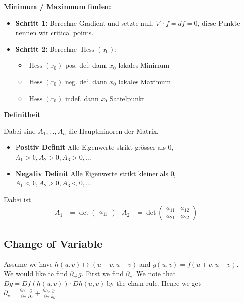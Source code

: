 \documentclass[25pt]{sciposter}
\newenvironment{method}[1]{\begin{mdframed}[backgroundcolor=blue!10,innertopmargin=15pt, innerbottommargin=15pt, nobreak=true]
		\textbf{#1 }
	}
	{ 
	\end{mdframed}
}
\begin{document}
\begin{multicols}{3}
\begin{method}{Minimum / Maxinmum finden:}
	\begin{itemize}
		\item \textbf{Schritt 1:} Berechne Gradient und setzte null. $\nabla \cdot f = df = 0$, diese Punkte nennen wir critical points.
		\item \textbf{Schritt 2:} Berechne $\operatorname{Hess}(x_0)$:\begin{itemize}
			\item $\operatorname{Hess}(x_0)$ pos. def. dann $x_0$ lokales Minimum
			\item $\operatorname{Hess}(x_0)$ neg. def. dann $x_0$ lokales Maximum
			\item $\operatorname{Hess}(x_0)$ indef. dann $x_0$ Sattelpunkt
		\end{itemize}
	\end{itemize}
\end{method}

\begin{method}{Definitheit}
	Dabei sind $A_1, \ldots, A_n $ die Hauptminoren der Matrix.
	\begin{itemize}
		\item \textbf{Positiv Definit} Alle Eigenwerte strikt grösser als $0$, $A_1 > 0 , A_2 > 0, A_3 > 0, \ldots $
		\item \textbf{Negativ Definit} Alle Eigenwerte strikt kleiner als $0$, $A_1 < 0, A_2 > 0, A_3 < 0,\ldots$
	\end{itemize}
\end{method}
Dabei ist \begin{align*}
	A_1 &= \operatorname{det}\begin{pmatrix}
	a_{11}
	\end{pmatrix} &  A_2 &= \operatorname{det}\begin{pmatrix}
	a_{11} & a_{12} \\ a_{21} & a_{22}
	\end{pmatrix}
\end{align*}


\subsection*{Change of Variable}

Assume we have $h(u,v)\mapsto (u+v,u-v)$ and $g(u,v) = f(u+v,u-v) $. We would like to find $\partial_{v^2} g$. First we find $\partial_v$. We note that $Dg = Df(h(u,v)) \cdot Dh(u,v)$ by the chain rule. Hence we get
$\partial_v  = \frac{\partial h_1}{\partial v} \frac{\partial}{ \partial x} + \frac{\partial h_2}{\partial v} \frac{\partial}{ \partial y}$.


\end{multicols}
\end{document}
